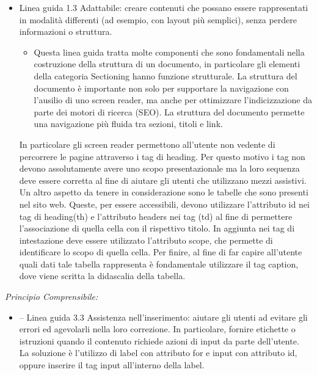 \documentclass[a4paper,final,12pt]{report}
\begin{document}
\begin{itemize}
\item Linea guida 1.3 Adattabile: creare contenuti che possano essere rappresentati in modalità differenti (ad esempio, con layout più semplici), senza perdere informazioni o struttura.
\begin{itemize}
\item Questa linea guida tratta molte componenti che sono fondamentali nella costruzione della struttura di un documento, in particolare gli elementi della categoria Sectioning hanno funzione strutturale. La struttura del documento è importante non solo per supportare la navigazione con l'ausilio di uno screen reader, ma anche per ottimizzare l'indicizzazione da parte dei motori di ricerca (SEO). La struttura del documento permette una navigazione più fluida tra sezioni, titoli e link.
\end{itemize}
In particolare gli screen reader permettono all'utente non vedente di percorrere le pagine attraverso i tag di heading. Per questo motivo i tag non devono assolutamente avere uno scopo presentazionale ma la loro sequenza deve essere corretta al fine di aiutare gli utenti che utilizzano mezzi assistivi.\\
Un altro aspetto da tenere in considerazione sono le tabelle che sono presenti nel sito web. Queste, per essere accessibili, devono utilizzare l'attributo id nei tag di heading(th) e l'attributo headers nei tag (td) al fine di permettere l'associazione di quella cella con il rispettivo titolo. In aggiunta nei tag di intestazione deve essere utilizzato l'attributo scope, che permette di identificare lo scopo di quella cella. Per finire, al fine di far capire all'utente quali dati tale tabella rappresenta è fondamentale utilizzare il tag caption, dove viene scritta la didascalia della tabella.
\end{itemize}
\newpage
\emph{Principio Comprensibile:}
\begin{itemize}
\item – Linea guida 3.3 Assistenza nell'inserimento: aiutare gli utenti ad evitare gli errori ed agevolarli nella loro correzione. In particolare, fornire etichette o istruzioni quando il contenuto richiede azioni di input da parte dell'utente.\\
La soluzione è l'utilizzo di label con attributo for e input con attributo id, oppure inserire il tag input all'interno della label.
\end{itemize}
\end{document}
